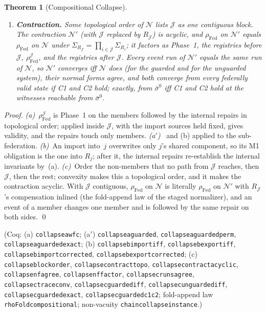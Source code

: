 \documentclass[11pt,a4paper]{article}
\theoremstyle{plain}
\newtheorem{theorem}{Theorem}[section]
\theoremstyle{definition}
\theoremstyle{remark}
\newcommand{\Fed}{\mathrm{Fed}}
\renewcommand{\_}{\textunderscore\allowbreak}
\begin{document}
\begin{theorem}[Compositional Collapse]
\begin{enumerate}[leftmargin=*,nosep,label=(\alph*)]
  $\rho_{\Fed}^{\mathcal{J}}$ restores the federal validity of
  $R_{\mathcal{J}}$ without changing any non-member.
\item \textbf{Contraction.}  Some topological order of $\mathcal{N}$ lists
  $\mathcal{J}$ as one contiguous block.  The contraction $\mathcal{N}'$ (with
  $\mathcal{J}$ replaced by $R_{\mathcal{J}}$) is acyclic, and $\rho_\Fed$ on
  $\mathcal{N}'$ equals $\rho_\Fed$ on $\mathcal{N}$ under
  $\Sigma_{R_{\mathcal{J}}} = \prod_{i \in \mathcal{J}} \Sigma_{R_i}$; it
  factors as Phase~1, the registries before $\mathcal{J}$,
  $\rho_{\Fed}^{\mathcal{J}}$, and the registries after $\mathcal{J}$.  Every
  event run of $\mathcal{N}'$ equals the same run of $\mathcal{N}$, so
  $\mathcal{N}'$ converges iff $\mathcal{N}$ does (for the guarded and for the
  unguarded system), their normal forms agree, and both converge from every
  federally valid state if C1 and C2 hold; exactly, from $\bar{\sigma}^0$ iff C1
  and C2 hold at the witnesses reachable from $\bar{\sigma}^0$.
\end{enumerate}
\end{theorem}

\begin{proof}
\emph{(a)}~$\rho_{\Fed}^{\mathcal{J}}$ is Phase~1 on the members followed by the
internal repairs in topological order;  applied
inside $\mathcal{J}$, with the import sources held fixed, gives validity, and
the repairs touch only members.  \emph{(a$'$)}~ and
(b) applied to the sub-federation.  \emph{(b)}~An
import into~$j$ overwrites only $j$'s shared component, so its M1 obligation is
the one into $R_j$; after it, the internal repairs re-establish the internal
invariants by~(a).  \emph{(c)}~Order the non-members that no path from
$\mathcal{J}$ reaches, then $\mathcal{J}$, then the rest; convexity makes this
a topological order, and it makes the contraction acyclic.  With $\mathcal{J}$
contiguous, $\rho_\Fed$ on $\mathcal{N}$ is literally $\rho_\Fed$ on
$\mathcal{N}'$ with $R_{\mathcal{J}}$'s compensation inlined (the fold-append
law of the staged normalizer), and an event of a member changes one member and
is followed by the same repair on both sides. \qed
\end{proof}

(Coq: (a) \texttt{collapse\_a\_wfc}; (a$'$) \texttt{collapse\_a\_guarded},
\texttt{collapse\_a\_guarded\_perm}, \texttt{collapse\_a\_guarded\_exact};
(b) \texttt{collapse\_b\_import\_iff}, \texttt{collapse\_b\_export\_iff},
\texttt{collapse\_b\_import\_corrected}, \texttt{collapse\_b\_export\_corrected};
(c) \texttt{collapse\_block\_order}, \texttt{collapse\_contract\_topo},
\texttt{collapse\_contract\_acyclic}, \texttt{collapse\_nf\_agree},
\texttt{collapse\_nf\_factor}, \texttt{collapse\_c\_runs\_agree},
\texttt{collapse\_c\_traceconv}, \texttt{collapse\_c\_guarded\_iff},
\texttt{collapse\_c\_unguarded\_iff}, \texttt{collapse\_c\_guarded\_exact},
\texttt{collapse\_c\_guarded\_c1\_c2}; fold-append law
\texttt{rhoFold\_compositional}; non-vacuity
\texttt{chain\_collapse\_instance}.)
\end{document}
